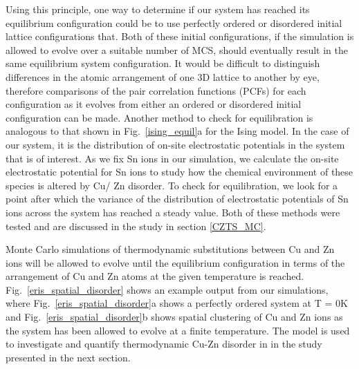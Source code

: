 \documentclass[11pt, twoside]{report}
\begin{document}
Using this principle, one way to determine if our system has reached its equilibrium configuration could be to use perfectly ordered or disordered initial lattice configurations that. Both of these initial configurations, if the simulation is allowed to evolve over a suitable number of MCS, should eventually result in the same equilibrium system configuration. It would be difficult to distinguish differences in the atomic arrangement of one 3D lattice to another by eye, therefore comparisons of the pair correlation functions (PCFs) for each configuration as it evolves from either an ordered or disordered initial configuration can be made. 
Another method to check for equilibration is analogous to that shown in Fig.~\ref{ising_equil}a for the Ising model. In the case of our system, it is the distribution of on-site electrostatic potentials in the system that is of interest. As we fix Sn ions in our simulation, we calculate the on-site electrostatic potential for Sn ions to study how the chemical environment of these species is altered by Cu/ Zn disorder. To check for equilibration, we look for a point after which the variance of the distribution of electrostatic potentials of Sn ions across the system has reached a steady value. Both of these methods were tested and are discussed in the study in section \ref{CZTS_MC}.

Monte Carlo simulations of thermodynamic substitutions between Cu and Zn ions will be allowed to evolve until the equilibrium configuration in terms of the arrangement of Cu and Zn atoms at the given temperature is reached. Fig.~\ref{eris_spatial_disorder} shows an example output from our simulations, where Fig.~\ref{eris_spatial_disorder}a shows a perfectly ordered system at T = 0K and Fig.~\ref{eris_spatial_disorder}b shows spatial clustering of Cu and Zn ions as the system has been allowed to evolve at a finite temperature. The model is used to investigate and quantify thermodynamic Cu-Zn disorder in {\CZTS} in the study presented in the next section. 
\end{document}
